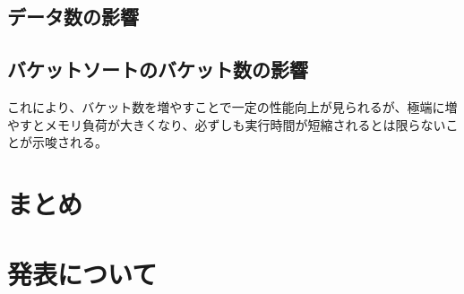 \documentclass[a4j, 12pt]{jarticle}
\begin{document}
\subsection{データ数の影響}
\subsection{バケットソートのバケット数の影響}
これにより、バケット数を増やすことで一定の性能向上が見られるが、極端に増やすとメモリ負荷が大きくなり、必ずしも実行時間が短縮されるとは限らないことが示唆される。
\section{まとめ}
\section{発表について}



\end{document}
